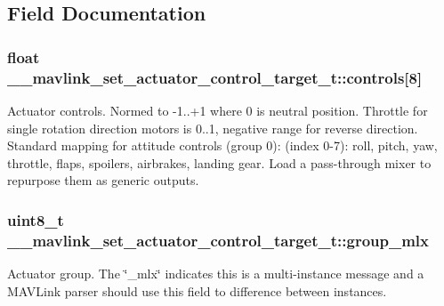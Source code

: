 \subsection{Field Documentation}
\hypertarget{struct____mavlink__set__actuator__control__target__t_a368c78b9f260d721473ba1cb5e54b7e5}{
\subsubsection[{controls}]{\setlength{\rightskip}{0pt plus 5cm}float \+\_\+\+\_\+mavlink\+\_\+set\+\_\+actuator\+\_\+control\+\_\+target\+\_\+t\+::controls\mbox{[}8\mbox{]}}}\label{struct____mavlink__set__actuator__control__target__t_a368c78b9f260d721473ba1cb5e54b7e5}


Actuator controls. Normed to -\/1..+1 where 0 is neutral position. Throttle for single rotation direction motors is 0..1, negative range for reverse direction. Standard mapping for attitude controls (group 0)\+: (index 0-\/7)\+: roll, pitch, yaw, throttle, flaps, spoilers, airbrakes, landing gear. Load a pass-\/through mixer to repurpose them as generic outputs. 

\hypertarget{struct____mavlink__set__actuator__control__target__t_ae8bc441bf68fc3e1a7abe5189318b878}{
\subsubsection[{group\+\_\+mlx}]{\setlength{\rightskip}{0pt plus 5cm}uint8\+\_\+t \+\_\+\+\_\+mavlink\+\_\+set\+\_\+actuator\+\_\+control\+\_\+target\+\_\+t\+::group\+\_\+mlx}}\label{struct____mavlink__set__actuator__control__target__t_ae8bc441bf68fc3e1a7abe5189318b878}


Actuator group. The \char`\"{}\+\_\+mlx\char`\"{} indicates this is a multi-\/instance message and a M\+A\+V\+Link parser should use this field to difference between instances. 

